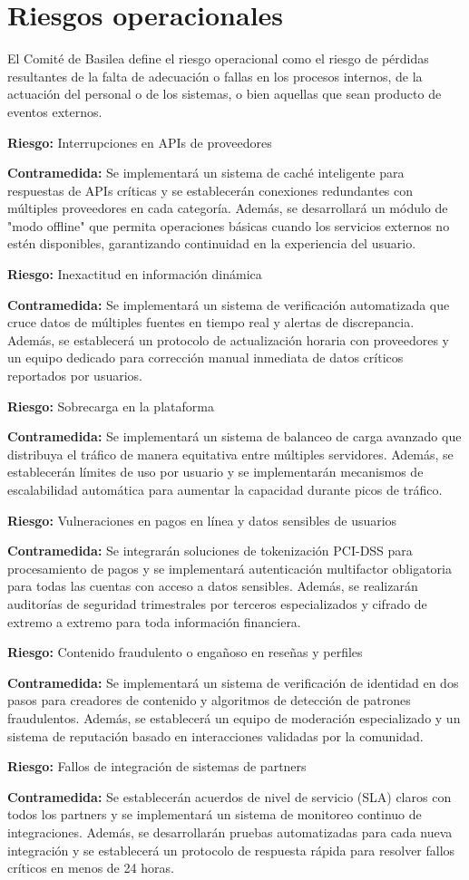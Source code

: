 \section{Riesgos operacionales}
El Comité de Basilea define el riesgo operacional como el riesgo de pérdidas resultantes de la falta de adecuación o fallas en los procesos internos, de la actuación del personal o de los sistemas, o bien aquellas que sean producto de eventos externos.

\textbf{Riesgo:} Interrupciones en APIs de proveedores

\textbf{Contramedida:} Se implementará un sistema de caché inteligente para respuestas de APIs críticas y se establecerán conexiones redundantes con múltiples proveedores en cada categoría. Además, se desarrollará un módulo de "modo offline" que permita operaciones básicas cuando los servicios externos no estén disponibles, garantizando continuidad en la experiencia del usuario.

\textbf{Riesgo:} Inexactitud en información dinámica

\textbf{Contramedida:} Se implementará un sistema de verificación automatizada que cruce datos de múltiples fuentes en tiempo real y alertas de discrepancia. Además, se establecerá un protocolo de actualización horaria con proveedores y un equipo dedicado para corrección manual inmediata de datos críticos reportados por usuarios.

\textbf{Riesgo:} Sobrecarga en la plataforma

\textbf{Contramedida:} Se implementará un sistema de balanceo de carga avanzado que distribuya el tráfico de manera equitativa entre múltiples servidores. Además, se establecerán límites de uso por usuario y se implementarán mecanismos de escalabilidad automática para aumentar la capacidad durante picos de tráfico.

\textbf{Riesgo:} Vulneraciones en pagos en línea y datos sensibles de usuarios

\textbf{Contramedida:} Se integrarán soluciones de tokenización PCI-DSS para procesamiento de pagos y se implementará autenticación multifactor obligatoria para todas las cuentas con acceso a datos sensibles. Además, se realizarán auditorías de seguridad trimestrales por terceros especializados y cifrado de extremo a extremo para toda información financiera.

\textbf{Riesgo:} Contenido fraudulento o engañoso en reseñas y perfiles

\textbf{Contramedida:} Se implementará un sistema de verificación de identidad en dos pasos para creadores de contenido y algoritmos de detección de patrones fraudulentos. Además, se establecerá un equipo de moderación especializado y un sistema de reputación basado en interacciones validadas por la comunidad.

\textbf{Riesgo:} Fallos de integración de sistemas de partners

\textbf{Contramedida:} Se establecerán acuerdos de nivel de servicio (SLA) claros con todos los partners y se implementará un sistema de monitoreo continuo de integraciones. Además, se desarrollarán pruebas automatizadas para cada nueva integración y se establecerá un protocolo de respuesta rápida para resolver fallos críticos en menos de 24 horas.
